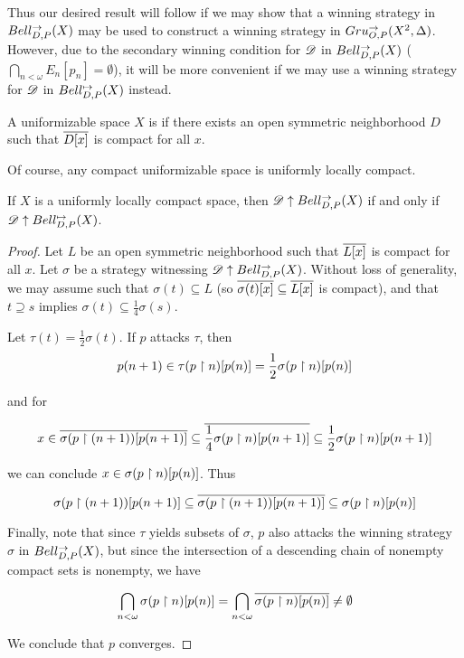 Thus our desired result will follow if we may show that a winning strategy
in $Bell_{D,P}^{\to}(X)$ may be used to construct a winning strategy in
$Gru_{O,P}^{\to}(X^2,\Delta)$. However, due to the secondary winning condition
for $\mathscr{D}$ in $Bell_{D,P}^{\to}(X)$ ($\bigcap_{n<\omega}E_n[p_n]=\emptyset$),
it will be more convenient if we may use a winning strategy for $\mathscr{D}$
in $Bell_{D,P}^{\mapsto}(X)$ instead.

\begin{defn}
  A uniformizable space $X$ is  if there
  exists an open symmetric neighborhood $D$ such that $\overline{D[x]}$ is compact
  for all $x$.
\end{defn}

Of course, any compact uniformizable space is uniformly locally compact.

\begin{thm}
  If $X$ is a uniformly locally compact space, then
  $\mathscr{D} \uparrow Bell_{D,P}^{\to}(X)$ if and only if
  $\mathscr{D} \uparrow Bell_{D,P}^{\mapsto}(X)$.
\end{thm}

\begin{proof}
  Let $L$ be an open symmetric neighborhood such that $\overline{L[x]}$ is compact
  for all $x$.
  Let $\sigma$ be a strategy witnessing $\mathscr{D}\uparrow Bell_{D,P}^{\to}(X)$.
  Without loss of generality, we may assume such that
  $\sigma(t)\subseteq L$
  (so $\overline{\sigma(t)[x]}\subseteq\overline{L[x]}$ is compact), and that
  $t \supseteq s$ implies $\sigma(t)\subseteq \frac{1}{4}\sigma(s)$.

  Let $\tau(t)=\frac{1}{2}\sigma(t)$. If $p$ attacks $\tau$, then
    \[
      p(n+1)
        \in
      \tau(p\restriction n)[p(n)]
        =
      \frac{1}{2}\sigma(p\restriction n)[p(n)]
    \]

  \noindent and for

    \[
      x
        \in
      \overline{\sigma(p\restriction (n+1))[p(n+1)]}
        \subseteq
      \overline{\frac{1}{4}\sigma(p\restriction n)[p(n+1)]}
        \subseteq
      \frac{1}{2}\sigma(p\restriction n)[p(n+1)]
    \]

  \noindent we can conclude $x\in\sigma(p\restriction n)[p(n)]$. Thus

    \[
      \sigma(p\restriction (n+1))[p(n+1)]
        \subseteq
      \overline{\sigma(p\restriction (n+1))[p(n+1)]}
        \subseteq
      \sigma(p\restriction n)[p(n)]
    \]

  Finally, note that since $\tau$ yields subsets of $\sigma$, $p$ also attacks
  the winning strategy $\sigma$ in $Bell_{D,P}^{\to}(X)$, but since the intersection
  of a descending chain of nonempty compact sets is nonempty, we have

    \[
      \bigcap_{n<\omega} \sigma(p\restriction n)[p(n)]
        =
      \bigcap_{n<\omega} \overline{\sigma(p\restriction n)[p(n)]}
        \not=
      \emptyset
    \]

  We conclude that $p$ converges.
\end{proof}

